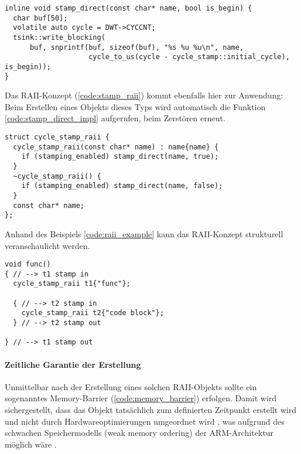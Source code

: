 \begin{code}
\begin{verbatim}
inline void stamp_direct(const char* name, bool is_begin) {
  char buf[50];
  volatile auto cycle = DWT->CYCCNT;
  tsink::write_blocking(
      buf, snprintf(buf, sizeof(buf), "%s %u %u\n", name,
                    cycle_to_us(cycle - cycle_stamp::initial_cycle), is_begin));
}
\end{verbatim}
    \label{code:stamp_direct_impl}
\end{code}

Das RAII-Konzept (\ref{code:stamp_raii}) kommt ebenfalls hier zur Anwendung:
Beim Erstellen eines Objekts dieses Typs wird automatisch die Funktion
\ref{code:stamp_direct_impl} aufgerufen, beim Zerstören erneut.

\begin{code}
\begin{verbatim}
struct cycle_stamp_raii {
  cycle_stamp_raii(const char* name) : name{name} {
    if (stamping_enabled) stamp_direct(name, true);
  }
  ~cycle_stamp_raii() {
    if (stamping_enabled) stamp_direct(name, false);
  }
  const char* name;
};

\end{verbatim}
    \label{code:stamp_raii}
\end{code}

Anhand des Beispiels \ref{code:raii_example} kann das RAII-Konzept strukturell
veranschaulicht werden.

\begin{code}
\begin{verbatim}
void func()
{ // --> t1 stamp in
  cycle_stamp_raii t1{"func"};

  { // --> t2 stamp in
    cycle_stamp_raii t2{"code block"};
  } // --> t2 stamp out

} // --> t1 stamp out
\end{verbatim}
    \label{code:raii_example}
\end{code}

\paragraph{Zeitliche Garantie der Erstellung}

Unmittelbar nach der Erstellung eines solchen RAII-Objekts sollte ein
sogenanntes Memory-Barrier (\ref{code:memory_barrier}) erfolgen. Damit wird
sichergestellt, dass das Objekt tatsächlich zum definierten Zeitpunkt erstellt
wird und nicht durch Hardwareoptimierungen umgeordnet wird
\cite{arm_mem_barrier}, was aufgrund des schwachen Speichermodells (weak memory
ordering) der ARM-Architektur möglich wäre \cite[S. 5]{arm_sync_overview}.

